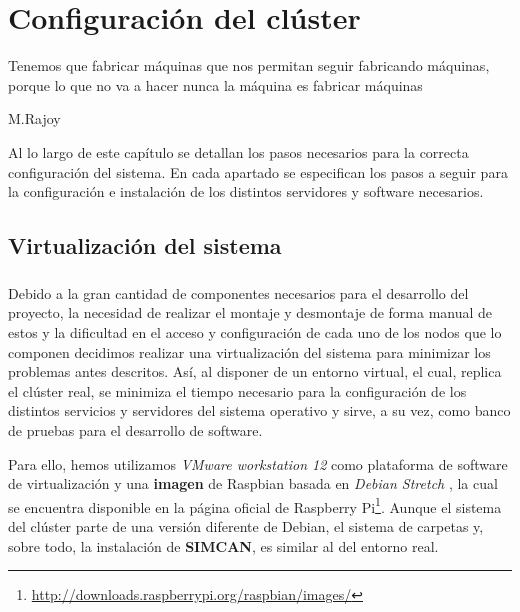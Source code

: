 \newpage
\chapter{Configuración del clúster}
\label{ch:capitulo3.tex}

\begin{FraseCelebre}
	\begin{Frase}
		Tenemos que fabricar máquinas que nos permitan seguir fabricando máquinas, porque lo que no va a hacer nunca la máquina es fabricar máquinas
	\end{Frase}
	\begin{Fuente}
	M.Rajoy
	\end{Fuente}
\end{FraseCelebre}

Al lo largo de este capítulo se detallan los pasos necesarios para la correcta configuración del sistema. En cada apartado se especifican los pasos a seguir para la configuración e instalación de los distintos servidores y software necesarios. 

\section{Virtualización del sistema}
\label{makereference3.1}
\paragraph{}

Debido a la gran cantidad de componentes necesarios para el desarrollo del proyecto, la necesidad de realizar el montaje y desmontaje de forma manual de estos y la dificultad en el acceso y configuración de cada uno de los nodos que lo componen decidimos realizar una virtualización del sistema para minimizar los problemas antes descritos. Así, al disponer de un entorno virtual, el cual, replica el clúster real, se minimiza el tiempo necesario para la configuración de los distintos servicios y servidores del sistema operativo y sirve, a su vez, como banco de pruebas para el desarrollo de software.

Para ello, hemos utilizamos \textit{VMware workstation 12} como plataforma de software de virtualización y una \textbf{imagen} de Raspbian basada en \textit{Debian Stretch} , la cual se encuentra disponible en la página oficial de Raspberry Pi\footnote{\url{http://downloads.raspberrypi.org/raspbian/images/}}. Aunque el sistema del clúster parte de una versión diferente de Debian, el sistema de carpetas y, sobre todo, la instalación de \textbf{SIMCAN}, es similar al del entorno real.

